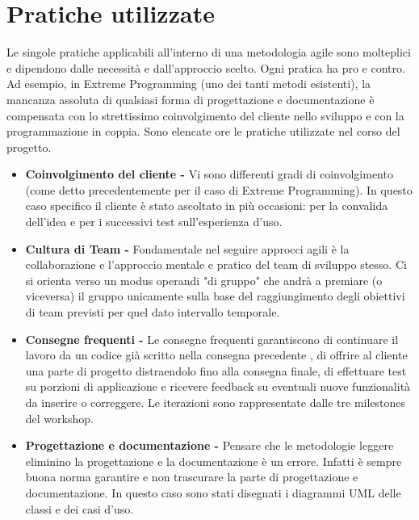 \section{Pratiche utilizzate}
Le singole pratiche applicabili all'interno di una metodologia agile sono molteplici e dipendono dalle necessità e dall'approccio scelto. Ogni pratica ha pro e contro. Ad esempio, in Extreme Programming (uno dei tanti metodi esistenti), la mancanza assoluta di qualsiasi forma di progettazione e documentazione è compensata con lo strettissimo coinvolgimento del cliente nello sviluppo e con la programmazione in coppia.
Sono elencate ore le pratiche utilizzate nel corso del progetto.

\begin{itemize}
\item \textbf{Coinvolgimento del cliente - }Vi sono differenti gradi di coinvolgimento (come detto precedentemente per il caso di Extreme Programming). In questo caso specifico il cliente è stato ascoltato in più occasioni: per la convalida dell'idea e per i successivi test sull'esperienza d'uso.
\item \textbf{Cultura di Team - }Fondamentale nel seguire approcci agili è la collaborazione e l'approccio mentale e pratico del team di sviluppo stesso. Ci si orienta verso un modus operandi "di gruppo" che andrà a premiare (o viceversa) il gruppo unicamente sulla base del raggiungimento degli obiettivi di team previsti per quel dato intervallo temporale.
\item \textbf{Consegne frequenti - }Le consegne frequenti garantiscono di continuare il lavoro da un codice già scritto nella consegna precedente , di  offrire al cliente una parte di progetto distraendolo fino alla consegna finale, di effettuare test su porzioni di applicazione e ricevere feedback su eventuali nuove funzionalità da inserire o correggere.
Le iterazioni sono rappresentate dalle tre milestones del workshop.
\item \textbf{Progettazione e documentazione - }Pensare che le metodologie leggere eliminino la progettazione e la documentazione è un errore. Infatti è sempre buona norma garantire e non trascurare la parte di progettazione e documentazione. In questo caso sono stati disegnati i diagrammi UML delle classi e dei casi d'uso.
\end{itemize}